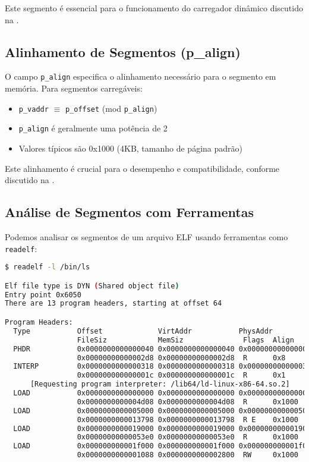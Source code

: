 Este segmento é essencial para o funcionamento do carregador dinâmico discutido na .

\subsection{Alinhamento de Segmentos (p\_align)}\label{subsec:segment_alignment}

O campo \texttt{p\_align} especifica o alinhamento necessário para o segmento em memória. Para segmentos carregáveis:

\begin{itemize}
    \item \texttt{p\_vaddr} $\equiv$ \texttt{p\_offset} (mod \texttt{p\_align})
    \item \texttt{p\_align} é geralmente uma potência de 2
    \item Valores típicos são 0x1000 (4KB, tamanho de página padrão)
\end{itemize}

Este alinhamento é crucial para o desempenho e compatibilidade, conforme discutido na .

\subsection{Análise de Segmentos com Ferramentas}\label{subsec:segment_analysis}

Podemos analisar os segmentos de um arquivo ELF usando ferramentas como \texttt{readelf}:

\begin{lstlisting}[language=bash, caption={Exemplo de uso do readelf para analisar segmentos}, label={lst:readelf_segments}]
$ readelf -l /bin/ls

Elf file type is DYN (Shared object file)
Entry point 0x6050
There are 13 program headers, starting at offset 64

Program Headers:
  Type           Offset             VirtAddr           PhysAddr
                 FileSiz            MemSiz              Flags  Align
  PHDR           0x0000000000000040 0x0000000000000040 0x0000000000000040
                 0x00000000000002d8 0x00000000000002d8  R      0x8
  INTERP         0x0000000000000318 0x0000000000000318 0x0000000000000318
                 0x000000000000001c 0x000000000000001c  R      0x1
      [Requesting program interpreter: /lib64/ld-linux-x86-64.so.2]
  LOAD           0x0000000000000000 0x0000000000000000 0x0000000000000000
                 0x0000000000004d08 0x0000000000004d08  R      0x1000
  LOAD           0x0000000000005000 0x0000000000005000 0x0000000000005000
                 0x0000000000013798 0x0000000000013798  R E    0x1000
  LOAD           0x0000000000019000 0x0000000000019000 0x0000000000019000
                 0x00000000000053e0 0x00000000000053e0  R      0x1000
  LOAD           0x000000000001f000 0x000000000001f000 0x000000000001f000
                 0x0000000000001088 0x0000000000002800  RW     0x1000
\end{lstlisting}

